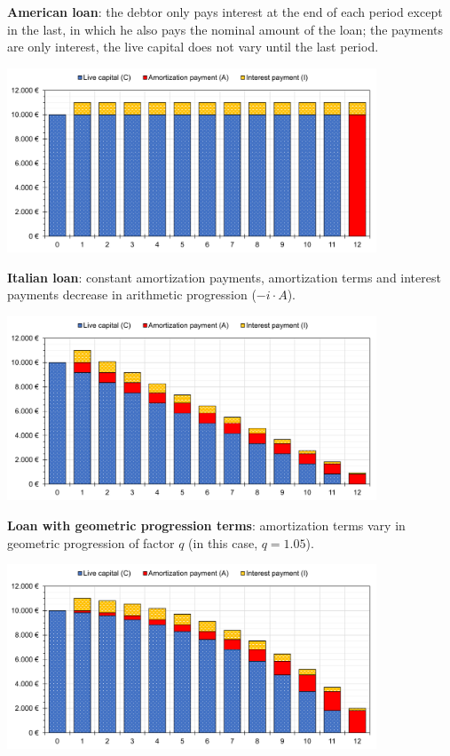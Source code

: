 \documentclass[10pt, a4paper]{article}
\begin{document}
	\textbf{American loan}: the debtor only pays interest at the end of each period except in the last, in which he also pays the nominal amount of the loan; the payments are only interest, the live capital does not vary until the last period.
	
	\begin{center}
		\includegraphics[width=11cm]{../figures/american-en.pdf}
	\end{center}
	
	\textbf{Italian loan}: constant amortization payments, amortization terms and interest payments decrease in arithmetic progression ($-i \cdot A$).	
	
	\begin{center}
		\includegraphics[width=11cm]{../figures/italian-en.pdf}
	\end{center}
	
	\textbf{Loan with geometric progression terms}: amortization terms vary in geometric progression of factor $q$ (in this case, $q = 1.05$).
	
	\begin{center}
		\includegraphics[width=11cm]{../figures/geometric-en.pdf}
	\end{center}
	
\end{document}

